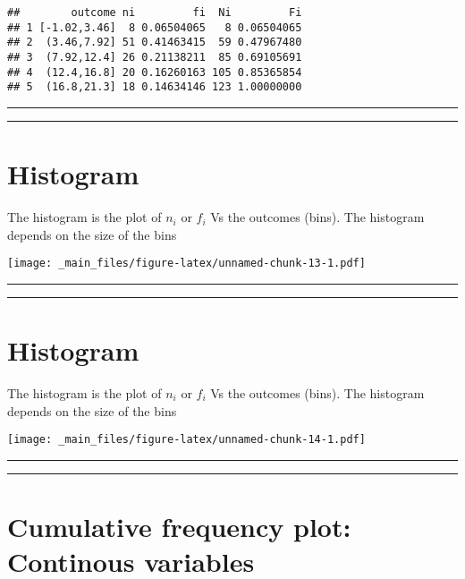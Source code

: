 \documentclass[
]{book}
\begin{document}
\begin{verbatim}
##        outcome ni         fi  Ni         Fi
## 1 [-1.02,3.46]  8 0.06504065   8 0.06504065
## 2  (3.46,7.92] 51 0.41463415  59 0.47967480
## 3  (7.92,12.4] 26 0.21138211  85 0.69105691
## 4  (12.4,16.8] 20 0.16260163 105 0.85365854
## 5  (16.8,21.3] 18 0.14634146 123 1.00000000
\end{verbatim}

\begin{center}\rule{0.5\linewidth}{0.5pt}\end{center}

\begin{center}\rule{0.5\linewidth}{0.5pt}\end{center}

\hypertarget{histogram}{%
\section{Histogram}\label{histogram}}

The histogram is the plot of \(n_i\) or \(f_i\) Vs the outcomes (bins). The histogram depends on the size of the bins

\texttt{[image: \_main\_files/figure-latex/unnamed-chunk-13-1.pdf]}

\begin{center}\rule{0.5\linewidth}{0.5pt}\end{center}

\begin{center}\rule{0.5\linewidth}{0.5pt}\end{center}

\hypertarget{histogram-1}{%
\section{Histogram}\label{histogram-1}}

The histogram is the plot of \(n_i\) or \(f_i\) Vs the outcomes (bins). The histogram depends on the size of the bins

\texttt{[image: \_main\_files/figure-latex/unnamed-chunk-14-1.pdf]}

\begin{center}\rule{0.5\linewidth}{0.5pt}\end{center}

\begin{center}\rule{0.5\linewidth}{0.5pt}\end{center}

\hypertarget{cumulative-frequency-plot-continous-variables}{%
\section{Cumulative frequency plot: Continous variables}\label{cumulative-frequency-plot-continous-variables}}
\end{document}
